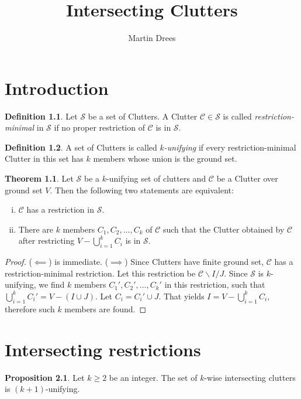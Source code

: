 \documentclass[a4paper, 12pt, twoside=false]{scrbook}
\title{Intersecting Clutters}
\author{Martin Drees}
\theoremstyle{definition}
\newtheorem{definition}{Definition}
\newtheorem{theorem}{Theorem}[section]
\newtheorem{proposition}{Proposition}
\begin{document}
   \maketitle
   \tableofcontents
   \chapter{Introduction}
   \begin{definition}
       Let $\mathcal{S}$ be a set of Clutters.
       A Clutter $\mathcal{C} \in \mathcal{S}$ is called \emph{restriction-minimal} in $\mathcal{S}$ if no proper restriction of $\mathcal{C}$ is in $\mathcal{S}$.
   \end{definition}

   \begin{definition}
       A set of Clutters is called \emph{$k$-unifying} if every restriction-minimal Clutter in this set has $k$ members whose union is the ground set.
   \end{definition}

   \begin{theorem}
       Let $\mathcal{S}$ be a $k$-unifying set of clutters and $\mathcal{C}$ be a Clutter over ground set $V$.
       Then the following two statements are equivalent:
       \leavevmode
       \begin{enumerate}[i)]
           \item $\mathcal{C}$ has a restriction in $\mathcal{S}$.
           \item There are $k$ members $C_1, C_2, \ldots, C_k$ of $\mathcal{C}$ such that the Clutter obtained by $\mathcal{C}$ after restricting $V - \bigcup_{i=1}^k C_i$ is in $\mathcal{S}$.
       \end{enumerate}
   \end{theorem}

   \begin{proof}
       ($\impliedby$) is immediate.
       ($\implies$) Since Clutters have finite ground set, $\mathcal{C}$ has a restriction-minimal restriction.
       Let this restriction be $\mathcal{C}\backslash I / J$.
       Since $\mathcal{S}$ is $k$-unifying, we find $k$ members $C_1', C_2', \ldots, C_k'$ in this restriction, such that $\bigcup_{i=1}^k C_i' = V - (I \cup J)$.
 Let $C_i = C_i' \cup J$.
       That yields $I=V-\bigcup_{i=1}^k C_i$, therefore such $k$ members are found.
   \end{proof}

   \chapter{Intersecting restrictions}
   \begin{proposition}
       Let $k\geq 2$ be an integer.
       The set of $k$-wise intersecting clutters is $(k+1)$-unifying.
   \end{proposition}
\end{document}

